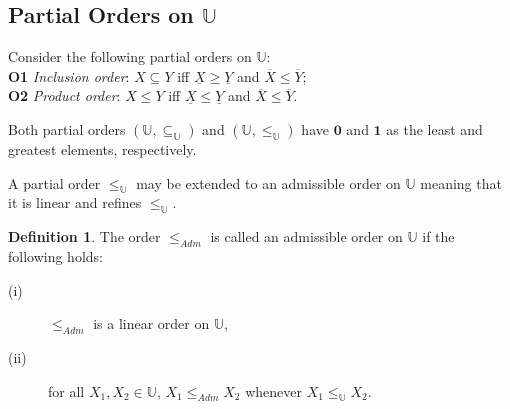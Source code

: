 \documentclass[conference]{IEEEtran}
\theoremstyle{plain}
\theoremstyle{remark}
\theoremstyle{definition}
\newtheorem{definition}[theorem]{Definition}
\theoremstyle{proposition}
\newcommand{\II}{\mathbb{I} }
\newcommand{\UU}{\mathbb{U} }
\begin{document}
\subsection{Partial Orders on $\UU$}

Consider the following partial orders on $\UU$:\\
\indent \textbf{O1} \emph{Inclusion order}: $X\subseteq Y$ iff $\underline{X}\geq \underline{Y}$ and $\overline{X}\leq\overline{Y}$;\\
\indent \textbf{O2} \emph{Product order}: $X\leq Y$ iff $\underline{X}\leq\underline{Y}$ and $\overline{X}\leq \overline{Y}$.


Both partial orders $(\mathbb{U},\subseteq_{\mathbb{U}})$ and $(\mathbb{U},\leq_{\mathbb{U}})$ have  $\mathbf{0}$  and  $\mathbf{1}$ as the least and greatest elements, respectively. 

A partial order $\leq_{\mathbb{U}}$ may be extended  to an admissible order on $\mathbb{U}$ meaning that it is linear and refines $\leq_{\mathbb{U}}$.

\begin{definition}\cite{Bustince:2013}\label{def-linearorder} The order $\leq_{Adm}$ is called an admissible order on $\mathbb{U}$ if the following holds:
\begin{description}
\item [(i)] $\leq_{Adm}$ is a linear order on $\mathbb{U}$,
\item [(ii)] for all $X_1, X_2 \in \mathbb{U}$, $X_1 \leq_{Adm} X_2$ whenever $X_1 \leq_{\mathbb{U}} X_2$.
\end{description}
\end{definition}
\end{document}
